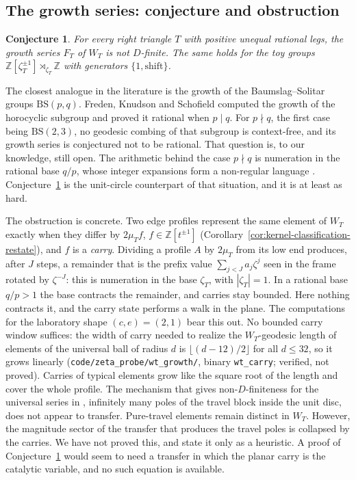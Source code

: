 \documentclass[11pt]{article}
\theoremstyle{plain}
\newtheorem{conjecture}[theorem]{Conjecture}
\theoremstyle{definition}
\theoremstyle{remark}
\newcommand{\Z}{\mathbb{Z}}
\begin{document}
\subsection{The growth series: conjecture and obstruction}

\begin{conjecture}
\label{conj:WT-nonDfinite}
For every right triangle $T$ with positive unequal rational legs, the growth
series $F_T$ of $W_T$ is not $D$-finite. The same holds for the toy groups
$\Z[\zeta_T^{\pm1}]\rtimes_{\zeta_T}\Z$ with generators $\{1,\text{shift}\}$.
\end{conjecture}

The closest analogue in the literature is the growth of the Baumslag--Solitar
groups $\mathrm{BS}(p,q)$. Freden, Knudson and Schofield \cite{FKS2011} computed the
growth of the horocyclic subgroup and proved it rational when $p\mid q$. For
$p\nmid q$, the first case being $\mathrm{BS}(2,3)$, no geodesic combing of that
subgroup is context-free, and its growth series is conjectured not to be
rational. That question is, to our knowledge, still open. The
arithmetic behind the case $p\nmid q$ is numeration in the rational base $q/p$,
whose integer expansions form a non-regular language
\cite{AFS2008}. Conjecture~\ref{conj:WT-nonDfinite} is the unit-circle counterpart
of that situation, and it is at least as hard.

The obstruction is concrete. Two edge profiles represent the same element of
$W_T$ exactly when they differ by $2\mu_Tf$, $f\in\Z[t^{\pm1}]$
(Corollary~\ref{cor:kernel-classification-restate}), and $f$ is a \emph{carry}.
Dividing a profile $A$ by $2\mu_T$ from its low end produces, after $J$ steps,
a remainder that is the prefix value $\sum_{j<J}a_j\zeta^j$ seen in the frame
rotated by $\zeta^{-J}$: this is numeration in the base $\zeta_T$, with
$|\zeta_T|=1$. In a rational base $q/p>1$ the base contracts the remainder, and
carries stay bounded. Here nothing contracts it, and the carry state performs
a walk in the plane. The computations for the laboratory shape $(c,e)=(2,1)$ bear this
out. No bounded carry window suffices: the width of carry needed to realize
the $W_T$-geodesic length of elements of the universal ball of radius $d$ is
$\lfloor(d-12)/2\rfloor$ for all $d\le32$, so it grows linearly
(\texttt{code/zeta\_probe/wt\_growth/}, binary \texttt{wt\_carry}; verified, not
proved). Carries of typical elements grow like the square root of the length
and cover the whole profile. The mechanism that gives non-$D$-finiteness for the
universal series in \cite{Bonfioli2026b}, infinitely many poles of the travel
block inside the unit disc, does not appear to transfer. Pure-travel elements
remain distinct in $W_T$. However, the magnitude sector of the transfer that
produces the travel poles is collapsed by the carries. We have not proved
this, and state it only as a heuristic. A proof of
Conjecture~\ref{conj:WT-nonDfinite} would seem to need a transfer in which the
planar carry is the catalytic variable, and no such equation is available.
\end{document}
